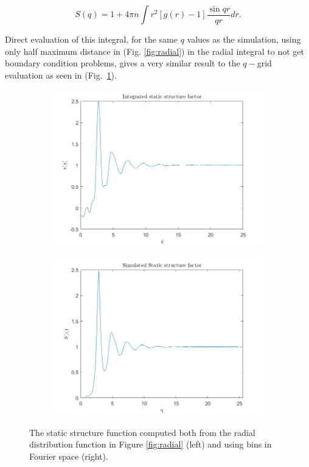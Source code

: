 \begin{equation}
S(q)= 1+ 4\pi n \int r^2\left[g(r)-1\right]\frac{\sin{qr}}{qr}dr.
\end{equation}

Direct evaluation of this integral, for the same $q$ values as the simulation, using only half maximum distance in (Fig. \ref{fig:radial}) in the radial integral to not get boundary condition problems, gives a very similar result to the $q-$grid evaluation as seen in (Fig.~\ref{fig:StaticStructure}).

\begin{figure}[H]
    \centering
    \captionsetup[subfigure]{justification=centering}
    \begin{subfigure}[b]{0.40\textwidth}
        \centering
        \includegraphics[width=\textwidth]{graphics/task8/integral.png}
    \end{subfigure}
    \begin{subfigure}[b]{0.40\textwidth}
        \centering
        \includegraphics[width=\textwidth]{graphics/task8/simulated.png}
    \end{subfigure}
    \caption{The static structure function computed both from the radial distribution function in Figure \ref{fig:radial} (left) and using bins in Fourier space (right).}
    \label{fig:StaticStructure}
\end{figure}




